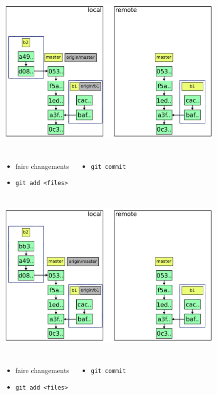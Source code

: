 \documentclass{beamer}
\begin{document}
\begin{frame}{}
  \centering
  \includegraphics[width=0.85\textwidth]{img/3-ter.pdf}
  \begin{columns}
  \begin{itemize}
  \small
  \item faire changements
  \item \lstinline|git add <files>|
  \end{itemize}
  \begin{itemize}
  \small
  \item \lstinline|git commit|
  \end{itemize}
  \end{columns}
\end{frame}

\begin{frame}{}
  \centering
  \includegraphics[width=0.85\textwidth]{img/3-quad.pdf}
  \begin{columns}
  \begin{itemize}
  \small
  \item faire changements
  \item \lstinline|git add <files>|
  \end{itemize}
  \begin{itemize}
  \small
  \item \lstinline|git commit|
  \end{itemize}
  \end{columns}
\end{frame}
\end{document}

